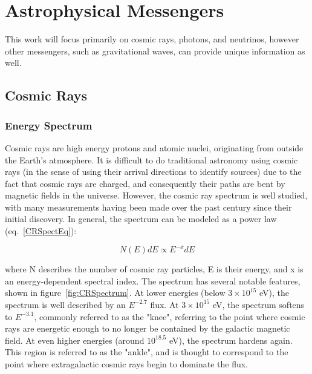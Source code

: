 \chapter{Astrophysical Messengers}\label{chapter:astromessengers}
This work will focus primarily on cosmic rays, photons, and neutrinos, however other messengers, such as gravitational waves, can provide unique information as well. 

\section{Cosmic Rays}
\subsection{Energy Spectrum}
Cosmic rays are high energy protons and atomic nuclei, originating from outside the Earth's atmosphere. It is difficult to do traditional astronomy  using cosmic rays (in the sense of using their arrival directions to identify sources) due to the fact that cosmic rays are charged, and consequently their paths are bent by magnetic fields in the universe. However, the cosmic ray spectrum is well studied, with many measurements having been made over the past century since their initial discovery. In general, the spectrum can be modeled as a power law (eq.~\ref{CRSpectEq}):

\begin{equation}
    N(E)dE \propto E^{-x}dE
\label{CRSpectEq}
\end{equation}

where N describes the number of cosmic ray particles, E is their energy, and x is an energy-dependent spectral index. The spectrum has several notable features, shown in figure~\ref{fig:CRSpectrum}. At lower energies (below $3 \times 10^{15}$ eV), the spectrum is well described by an $E^{-2.7}$ flux. At $3 \times 10^{15}$ eV, the spectrum softens to $E^{-3.1}$, commonly referred to as the "knee", referring to the point where cosmic rays are energetic enough to no longer be contained by the galactic magnetic field. At even higher energies (around $10^{18.5}$ eV), the spectrum hardens again. This region is referred to as the "ankle", and is thought to correspond to the point where extragalactic cosmic rays begin to dominate the flux. 

